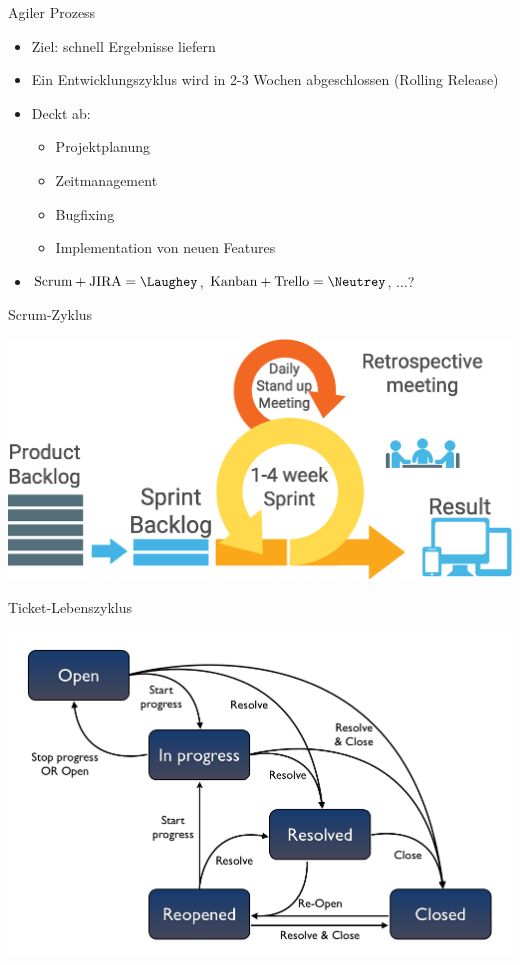 \documentclass{beamer}
\begin{document}
\begin{frame}{Agiler Prozess}
	\begin{itemize}
		\item Ziel: schnell Ergebnisse liefern
		\item Ein Entwicklungszyklus wird in 2-3 Wochen abgeschlossen (Rolling Release)
		\item Deckt ab:
			\begin{itemize}
				\item Projektplanung
				\item Zeitmanagement
				\item Bugfixing
				\item Implementation von neuen Features
			\end{itemize}
		\item $\text{Scrum} + \text{JIRA} = \Laughey$, $\text{Kanban} + \text{Trello} = \Neutrey$, $\ldots$?
	\end{itemize}
\end{frame}

\begin{frame}{Scrum-Zyklus}
	\begin{center}
		\includegraphics[scale=.25]{scrum-process.eps}
	\end{center}
\end{frame}

\begin{frame}{Ticket-Lebenszyklus}
	\begin{center}
		\includegraphics[scale=.5]{jira-ticket-lifecycle.png}
	\end{center}
\end{frame}
\end{document}
